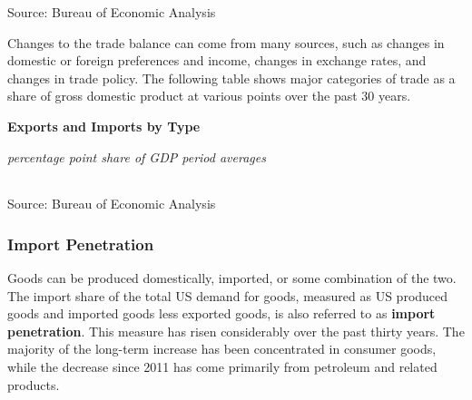 \documentclass{report}
\makeatletter
\newcommand{\tbllink}[1]{\href{https://raw.githubusercontent.com/bdecon/US-chartbook/master/chartbook/data/#1}{\faTable}}
\newcommand*\short[1]{\expandafter\@gobbletwo\number\numexpr#1\relax}
\newcommand{\sbar}[4]{
		\addplot[ybar stacked, bar width=2.3pt, draw opacity=0, fill=#1] 
			table [x=#2, y=#3, col sep=comma]{#4};}
\newcommand{\dateaxisticks}{
		date coordinates in=x, axis line style={draw=none},
		xmax={2023-10-01},
		max space between ticks=40,	    
		xtick={{1990-01-01}, {1992-01-01}, {1994-01-01}, 
			{1996-01-01}, {1998-01-01}, {2000-01-01}, 
			{2002-01-01}, {2004-01-01}, {2006-01-01},
			{2008-01-01}, {2010-01-01}, {2012-01-01}, {2014-01-01},
		    {2016-01-01}, {2018-01-01}, {2020-01-01}, {2022-01-01}, 
		    {2024-01-01}, {2026-01-01}},
		minor xtick={{1989-01-01}, {1991-01-01}, {1993-01-01},
			{1995-01-01}, {1997-01-01}, {1999-01-01}, 
			{2001-01-01}, {2003-01-01}, {2005-01-01}, {2007-01-01},
		    {2009-01-01}, {2011-01-01}, {2013-01-01}, {2015-01-01},
		    {2017-01-01}, {2019-01-01}, {2021-01-01}, {2023-01-01}, 
		    {2025-01-01}, {2027-01-01}},
		enlarge y limits={0.06}, enlarge x limits={0.01},
		}
\newcommand{\bbar}[2]{extra #1 ticks = {{#2}}, extra #1 tick labels = ,
		extra #1 tick style = {grid=major, grid style={thick, black!25}},}
\newcommand{\rbars}{
		\fill[color=black!10] (axis cs:{1990-07-01},\pgfkeysvalueof{/pgfplots/ymin}) rectangle 
			(axis cs:{1991-03-01}, \pgfkeysvalueof{/pgfplots/ymax});
		\fill[color=black!10] (axis cs:{2007-12-01},\pgfkeysvalueof{/pgfplots/ymin}) rectangle 
			(axis cs:{2009-07-01}, \pgfkeysvalueof{/pgfplots/ymax});
		\fill[color=black!10] (axis cs:{2001-03-01},\pgfkeysvalueof{/pgfplots/ymin}) rectangle 
			(axis cs:{2001-11-01}, \pgfkeysvalueof{/pgfplots/ymax});
		\fill[color=black!10] (axis cs:{2020-02-01},\pgfkeysvalueof{/pgfplots/ymin}) rectangle 
			(axis cs:{2020-05-01}, \pgfkeysvalueof{/pgfplots/ymax});}
\makeatother
\begin{document}
{\begin{minipage}{0.76\textwidth}
\hspace{3mm} 

\footnotesize{Source: Bureau of Economic Analysis} \hfill \tbllink{nx.csv}
\end{minipage}
\newpage
\begin{minipage}{0.76\textwidth}
\small Changes to the trade balance can come from many sources, such as changes in domestic or foreign preferences and income, changes in exchange rates, and changes in trade policy. The following table shows major categories of trade as a share of gross domestic product at various points over the past 30 years. 
\vspace{1mm}

\normalsize \textbf{Exports and Imports by Type}\\
\footnotesize{\textit{percentage point share of GDP \hspace{40mm} period averages}\\ 
 \setlength{\tabcolsep}{3.1pt} \color{black!90}
	{\renewcommand{\arraystretch}{1.55}
		\begin{tabular}{p{42mm} R{7.1mm} R{7.1mm} R{7.1mm} R{7.1mm} R{7.1mm} 
		   R{7.1mm} R{7.1mm} R{7.1mm} }
			  \hline
		\end{tabular}}\vspace{-2mm}
		
\footnotesize{Source: Bureau of Economic Analysis}}
\end{minipage}
\newpage
\begin{minipage}{0.76\textwidth}  
\subsubsection*{Import Penetration} 
\small Goods can be produced domestically, imported, or some combination of the two. The import share of the total US demand for goods, measured as US produced goods and imported goods less exported goods, is also referred to as \textbf{import penetration}. This measure has risen considerably over the past thirty years. The majority of the long-term increase has been concentrated in consumer goods, while the decrease since 2011 has come primarily from petroleum and related products. 


\end{minipage}}
\end{document}
